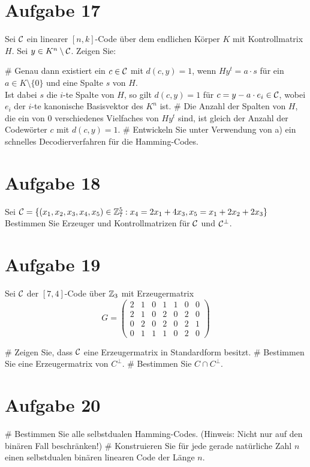 
\setcounter{MaxMatrixCols}{20}

\section*{Aufgabe 17}
Sei $\mathcal{C}$ ein linearer $[n,k]$-Code über dem endlichen Körper $K$ mit Kontrollmatrix $H$.
Sei $y \in K^n \setminus \mathcal{C}$. Zeigen Sie:
\begin{myList}
#
Genau dann existiert ein $c \in \mathcal{C}$ mit $d(c,y)=1$, wenn $Hy^t = a \cdot s$ für ein $a \in K \setminus \lbrace 0 \rbrace$ und eine Spalte $s$ von $H$.\\
Ist dabei $s$ die $i$-te Spalte von $H$, so gilt $d(c,y) = 1$ für $c = y -a\cdot e_i \in \mathcal{C}$, wobei $e_i$ der $i$-te kanonische Basisvektor des $K^n$ ist.
#
Die Anzahl der Spalten von $H$, die ein von 0 verschiedenes Vielfaches von $Hy^t$ sind, ist gleich der Anzahl der Codewörter $c$ mit $d(c,y) = 1$.
#
Entwickeln Sie unter Verwendung von a) ein schnelles Decodierverfahren für die Hamming-Codes.
\end{myList}
\section*{Aufgabe 18}
Sei $\mathcal{C} = \lbrace (x_1,x_2,x_3,x_4,x_5) \in \mathbb{Z}^5_7 : x_4 = 2x_1 + 4x_3, x_5 = x_1 + 2x_2 + 2x_3 \rbrace$
Bestimmen Sie Erzeuger und Kontrollmatrizen für $\mathcal{C}$ und $\mathcal{C}^\bot$.
\section*{Aufgabe 19}
Sei $\mathcal{C}$ der $[7,4]$-Code über $\mathbb{Z}_3$ mit Erzeugermatrix
\begin{equation*}
	G =
	\begin{pmatrix}
	2 & 1 & 0 & 1 & 1 & 0 & 0 \\
	2 & 1 & 0 & 2 & 0 & 2 & 0 \\
	0 & 2 & 0 & 2 & 0 & 2 & 1 \\
	0 & 1 & 1 & 1 & 0 & 2 & 0
	\end{pmatrix}
\end{equation*}
\begin{myList}
#
Zeigen Sie, dass $\mathcal{C}$ eine Erzeugermatrix in Standardform besitzt.
#
Bestimmen Sie eine Erzeugermatrix von $C^\bot$.
#
Bestimmen Sie $C \cap C^\bot$.
\end{myList}
\section*{Aufgabe 20}
\begin{myList}
#
Bestimmen Sie alle selbstdualen Hamming-Codes.
(Hinweis: Nicht nur auf den binären Fall beschränken!)
#
Konstruieren Sie für jede gerade natürliche Zahl $n$ einen selbstdualen binären linearen Code der Länge $n$.
\end{myList}
